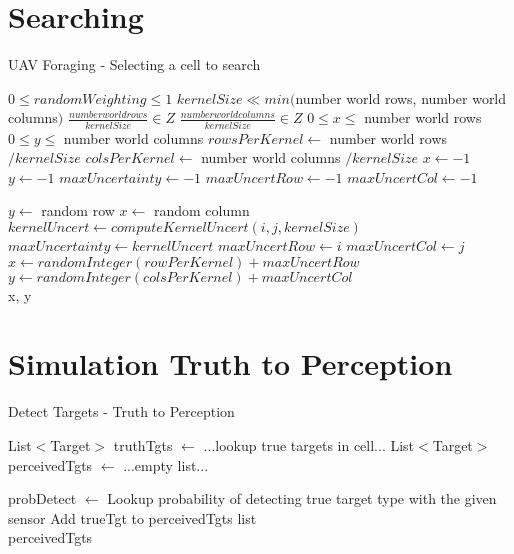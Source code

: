 \section{Searching}
\begin{algorithm}[H]
	\caption{UAV Foraging - Selecting a cell to search}
	\label{alg:forage}
	\begin{algorithmic}[1]
		\Require $ 0\le randomWeighting \le 1$
		\Require $ kernelSize \ll min($number world rows, number world columns$)$
		\Require $ \frac{number world rows}{kernelSize} \in Z$
		\Require $ \frac{number world columns}{kernelSize} \in Z$
		\Ensure $ 0 \le x \le $ number world rows
		\Ensure $ 0 \le y \le $ number world columns
		\State $rowsPerKernel\gets $ number world rows $ / kernelSize$
		\State $colsPerKernel\gets $ number world columns $ / kernelSize$		
		\State $x\gets -1$
		\State $y\gets -1$
		\State $maxUncertainty\gets -1$
		\State $maxUncertRow\gets -1$
		\State $maxUncertCol\gets -1$
		
		
		\State $ y\gets $ random row
		\State $ x\gets $ random column
		\Else
		\State $kernelUncert\gets computeKernelUncert(i,j, kernelSize)$
		\State $maxUncertainty\gets kernelUncert$
		\State $maxUncertRow\gets i$
		\State $maxUncertCol\gets j$	
		\EndIf
		\EndFor
		\EndFor
		\State $x\gets randomInteger(rowPerKernel) + maxUncertRow$			
		\State $y\gets randomInteger(colsPerKernel) + maxUncertCol$
		\EndIf \\
		
		\Return x, y
		\EndFunction
	\end{algorithmic}
\end{algorithm}



\section{Simulation Truth to Perception}
\begin{algorithm}[H]
	\caption{Detect Targets - Truth to Perception}
	\label{alg:detectTgts}
	\begin{algorithmic}[1]
			\State List$<$Target$>$ truthTgts $\gets$ ...lookup true targets in cell...
			\State List$<$Target$>$ perceivedTgts $\gets$ ...empty list...

				\State probDetect $\gets$ Lookup probability of detecting true target type with the given sensor
					\State Add trueTgt to perceivedTgts list
				\EndIf
			\EndFor \\
			\Return perceivedTgts
		\EndFunction
	\end{algorithmic}
\end{algorithm}

